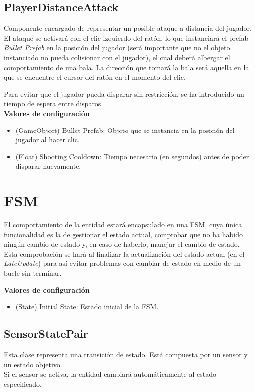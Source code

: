 \subsection{PlayerDistanceAttack}

Componente encargado de representar un posible ataque a distancia del jugador. El ataque se activará con el clic izquierdo del ratón, lo que instanciará el prefab \textit{Bullet Prefab} en la posición del jugador (será importante que no el objeto instanciado no pueda colisionar con el jugador), el cual deberá albergar el comportamiento de una bala. La dirección que tomará la bala será aquella en la que se encuentre el cursor del ratón en el momento del clic.

Para evitar que el jugador pueda disparar sin restricción, se ha introducido un tiempo de espera entre disparos.\\

\textbf{Valores de configuración}
\begin{itemize}
	\item (GameObject) Bullet Prefab: Objeto que se instancia en la posición del jugador al hacer clic.
	\item (Float) Shooting Cooldown: Tiempo necesario (en segundos) antes de poder disparar nuevamente.
\end{itemize}

\section {FSM}

El comportamiento de la entidad estará encapsulado en una FSM, cuya única funcionalidad es la de gestionar el estado actual, comprobar que no ha habido ningún cambio de estado y, en caso de haberlo, manejar el cambio de estado.\\
Esta comprobación se hará al finalizar la actualización del estado actual (en el \textit{LateUpdate}) para así evitar problemas con cambiar de estado en medio de un bucle sin terminar.

\textbf{Valores de configuración}
\begin{itemize}
	\item (State) Initial State: Estado inicial de la FSM.
\end{itemize}

\subsection{SensorStatePair}
Esta clase representa una transición de estado. Está compuesta por un sensor y un estado objetivo.\\
Si el sensor se activa, la entidad cambiará automáticamente al estado especificado.\\

